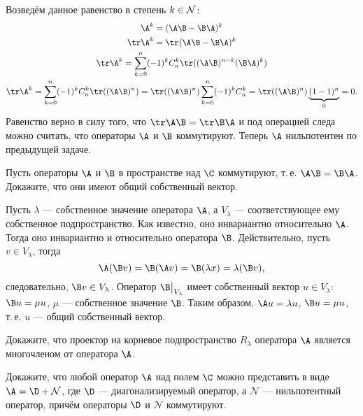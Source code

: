 \begin{solution}
    Возведём данное равенство в степень $k \in \N$:
    \begin{gather*}
        \A^k = (\A\B - \B\A)^k\\
        \tr\A^k = \tr(\A\B - \B\A)^k\\
        \tr\A^k = \sum_{k = 0}^n(-1)^kC_n^k\tr((\A\B)^{n - k}(\B\A)^k)\\
        \tr\A^k = \sum_{k = 0}^n(-1)^kC_n^k\tr((\A\B)^n) = \tr((\A\B)^n)\sum_{k = 0}^n(-1)^kC_n^k = \tr((\A\B)^n)\underbrace{(1 - 1)^n}_{0} = 0.
    \end{gather*}
    Равенство верно в силу того, что $\tr\A\B = \tr\B\A$ и под операцией следа можно считать, что операторы $\A$ и $\B$ коммутируют. Теперь $\A$ нильпотентен по предыдущей задаче.
\end{solution}

\begin{problem}
    Пусть операторы $\A$ и $\B$ в пространстве над $\C$ коммутируют, т.\,е. $\A\B = \B\A$. Докажите, что они имеют общий собственный вектор.
\end{problem}

\begin{solution}
    Пусть $\lambda$ --- собственное значение оператора $\A$, а $V_\lambda$ --- соответствующее ему собственное подпространство. Как известно, оно инвариантно относительно $\A$. Тогда оно инвариантно и относительно оператора $\B$. Действительно, пусть $v \in V_\lambda$, тогда
    \[
        \A(\B v) = \B(\A v) = \B(\lambda x) = \lambda(\B v),
    \]
    следовательно, $\B v \in V_\lambda$. Оператор $\B\big|_{V_\lambda}$ имеет собственный вектор $u \in V_\lambda$: $\B u = \mu u$, $\mu$ --- собственное значение $\B$. Таким образом, $\A u = \lambda u$, $\B u = \mu u$, т.\,е. $u$ --- общий собственный вектор.
\end{solution}

\begin{problem}
    Докажите, что проектор на корневое подпространство $R_\lambda$ оператора $\A$ является многочленом от оператора $\A$.
\end{problem}

\renewcommand{\N}{\mathcal{N}}

\begin{problem}
    Докажите, что любой оператор $\A$ над полем $\C$ можно представить в виде $\A = \D + \N$, где $\D$ --- диагонализируемый оператор, а $\N$ --- нильпотентный оператор, причём операторы $\D$ и $\N$ коммутируют.
\end{problem}

